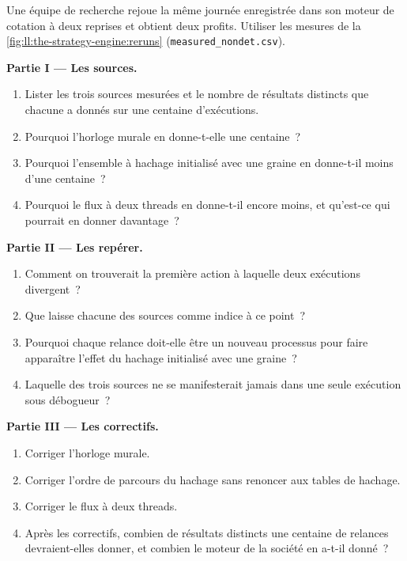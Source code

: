 \begin{problem}\label{pb:ll:the-strategy-engine:1}
Une équipe de recherche rejoue la même journée enregistrée dans son moteur de cotation à deux reprises et obtient deux profits. Utiliser les mesures de la
\cref{fig:ll:the-strategy-engine:reruns} (\texttt{measured\_nondet.csv}).

\medskip\noindent\textbf{Partie I --- Les sources.}
\begin{enumerate}
\item Lister les trois sources mesurées et le nombre de résultats distincts que chacune a donnés sur une centaine d'exécutions.
\item Pourquoi l'horloge murale en donne-t-elle une centaine~?
\item Pourquoi l'ensemble à hachage initialisé avec une graine en donne-t-il moins d'une centaine~?
\item Pourquoi le flux à deux threads en donne-t-il encore moins, et qu'est-ce qui pourrait en donner davantage~?
\end{enumerate}

\medskip\noindent\textbf{Partie II --- Les repérer.}
\begin{enumerate}[resume]
\item Comment on trouverait la première action à laquelle deux exécutions divergent~?
\item Que laisse chacune des sources comme indice à ce point~?
\item Pourquoi chaque relance doit-elle être un nouveau processus pour faire apparaître l'effet du hachage initialisé avec une graine~?
\item Laquelle des trois sources ne se manifesterait jamais dans une seule exécution sous débogueur~?
\end{enumerate}

\medskip\noindent\textbf{Partie III --- Les correctifs.}
\begin{enumerate}[resume]
\item Corriger l'horloge murale.
\item Corriger l'ordre de parcours du hachage sans renoncer aux tables de hachage.
\item Corriger le flux à deux threads.
\item Après les correctifs, combien de résultats distincts une centaine de relances devraient-elles donner, et combien le moteur de la société en a-t-il donné~?
\end{enumerate}


\end{problem}
